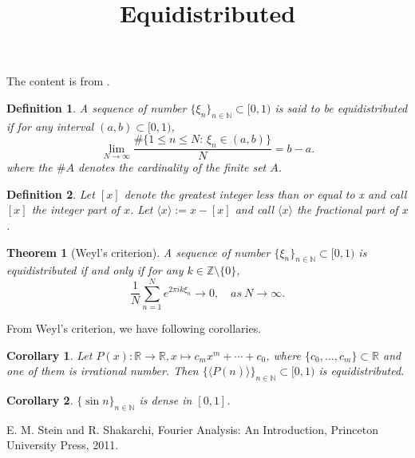 \documentclass[a4paper,12pt]{article}
\title{Equidistributed}
\author{}
\newtheorem{theorem}{Theorem}
\newtheorem{definition}{Definition}
\newtheorem{corollary}{Corollary}
\begin{document}
\maketitle

The content is from \cite[Chapter 4, Section 2]{ss11}.

\begin{definition}
    A sequence of number $ \{ \xi_n \}_{n \in \mathbb{N}} \subset [0, 1) $ is said to be equidistributed 
    if for any interval $ (a, b) \subset [0, 1) $, 
    $$ 
        \lim_{N \to \infty} \frac{ \# \{1 \leq n \leq N: \, \xi_n \in (a, b) \}}{N} = b - a. 
    $$
where the $ \# A $ denotes the cardinality of the finite set $ A $.
\end{definition}

\begin{definition}
    Let $ [x] $ denote the greatest integer less than or equal to x and call $ [x] $ the integer part of $ x $.
    Let $ \langle x \rangle := x - [x] $ and call $ \langle x \rangle $ the fractional part of $ x $.
\end{definition}

\begin{theorem}[Weyl's criterion]
    A sequence of number $ \{ \xi_n \}_{n \in \mathbb{N}} \subset [0, 1) $ is equidistributed 
    if and only if for any $ k \in \mathbb{Z} \setminus \{0\} $,
    $$ 
        \frac{1}{N}\sum_{n=1}^N e^{2 \pi i k \xi_{n}} \to 0, \quad as \ N \to \infty. 
    $$
\end{theorem}

From Weyl's criterion, we have following corollaries.

\begin{corollary}
    Let $ P(x) : \mathbb{R} \to \mathbb{R}, x \mapsto c_m x^m + \cdots + c_0 $, 
    where $ \{c_0, \ldots, c_m\} \subset \mathbb{R} $ and one of them is irrational number. 
    Then $ \{ \langle P(n) \rangle \}_{n \in \mathbb{N}} \subset [0, 1) $ is equidistributed.
\end{corollary}

\begin{corollary}
    $ \{ \sin n \}_{n \in \mathbb{N}} $ is dense in $ [0, 1] $.
\end{corollary}

\begin{thebibliography}{99}

     E. M. Stein and R. Shakarchi, Fourier Analysis: An Introduction, Princeton University Press, 2011.
    
\end{thebibliography}
\end{document}
